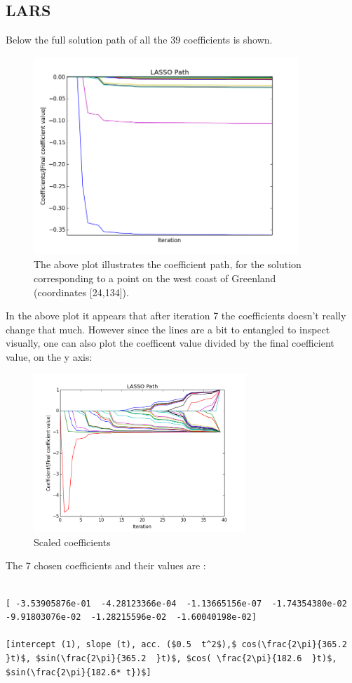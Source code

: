 \pagebreak
\subsection{LARS}

Below the full solution path of all the 39 coefficients is shown.
\begin{figure}[H]
\center
\includegraphics[width=10cm]{figures/lasso_path.png}
\caption{The above plot illustrates the coefficient path, for the solution corresponding to a point on the west coast of Greenland (coordinates [24,134]).}
\end{figure}
In the above plot it appears that after iteration 7 the coefficients doesn't really change that much. However since the lines are a bit to entangled to inspect visually, one can also plot the coefficent value divided by the final coefficient value, on the y axis:
\begin{figure}[H]
\center
\includegraphics[width=8cm]{figures/lasso_path_scaled.png}
\caption{Scaled coefficients}
\end{figure}
\pagebreak
The 7 chosen coefficients and their values are :
\begin{lstlisting}[mathescape]

[ -3.53905876e-01  -4.28123366e-04  -1.13665156e-07  -1.74354380e-02  -9.91803076e-02  -1.28215596e-02  -1.60040198e-02]

[intercept (1), slope (t), acc. ($0.5  t^2$),$ cos(\frac{2\pi}{365.2 }t)$, $sin(\frac{2\pi}{365.2  }t)$, $cos( \frac{2\pi}{182.6  }t)$, $sin(\frac{2\pi}{182.6* t})$]
\end{lstlisting}
